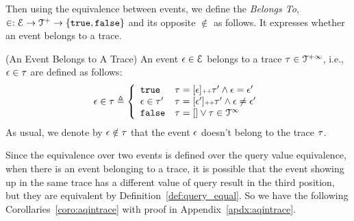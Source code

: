 {{Then using the equivalence between events, we
define the \emph{Belongs To}, 
 $\in : \mathcal{E} \to \mathcal{T}^{+} \to \{\mathtt{true}, \mathtt{false} \} $
 and its opposite $\not\in$ as follows.
It expresses whether an event belongs to a trace.
 \begin{defn}(An Event Belongs to A Trace)
 \label{def:event_belong}
An event $\mathtt{\epsilon} \in \mathcal{E}$ belongs to a trace $\mathtt{\tau} \in \mathcal{T}^{+\infty}$, i.e., $\mathtt{\epsilon} \in \mathtt{\tau}$ are defined as follows:
 \begin{equation*}
 \event \in \trace 
 \triangleq \left\{
 \begin{array}{ll} 
 \etrue & \trace = [\event] \tracecat \trace'
 \land \event = \event' \\
 \event \in \trace' & \trace = [\event'] \tracecat \trace'
 \land \event \neq \event' \\ 
 \efalse & \trace = [] \lor \trace \in \inftdom
 \end{array}
 \right.
 \end{equation*}
 As usual, we denote by $\mathtt{\epsilon} \notin \mathtt{\tau}$ that the event $\mathtt{\epsilon}$ doesn't belong to the trace $\mathtt{\tau}$.
 \end{defn}
Since the equivalence over two events is defined over the query value equivalence, 
when there is an event belonging to a trace, 
it is possible that 
the event showing up in the same trace has a different value of query result in the third position, 
but they are equivalent by Definition~\ref{def:query_equal}.
So we have the following Corollaries~\ref{coro:aqintrace} with proof in Appendix~\ref{apdx:aqintrace}.
\begin{coro}
\label{coro:aqintrace}

\end{coro}}}
